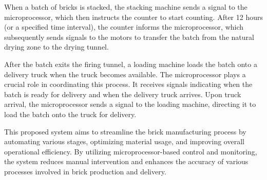 When a batch of bricks is stacked, the stacking machine sends a signal to the microprocessor, which then instructs the counter to start counting. After 12 hours (or a specified time interval), the counter informs the microprocessor, which subsequently sends signals to the motors to transfer the batch from the natural drying zone to the drying tunnel.

After the batch exits the firing tunnel, a loading machine loads the batch onto a delivery truck when the truck becomes available. The microprocessor plays a crucial role in coordinating this process. It receives signals indicating when the batch is ready for delivery and when the delivery truck arrives. Upon truck arrival, the microprocessor sends a signal to the loading machine, directing it to load the batch onto the truck for delivery.

This proposed system aims to streamline the brick manufacturing process by automating various stages, optimizing material usage, and improving overall operational efficiency. By utilizing microprocessor-based control and monitoring, the system reduces manual intervention and enhances the accuracy of various processes involved in brick production and delivery.